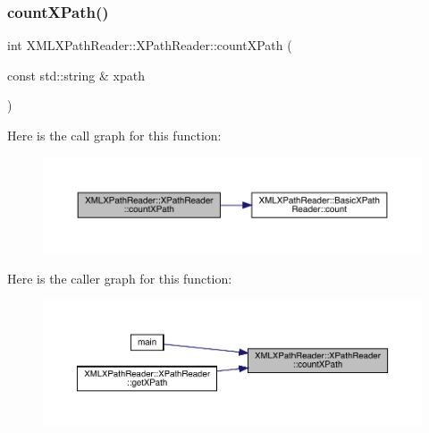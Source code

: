 \subsubsection{\texorpdfstring{countXPath()}{countXPath()}\hspace{0.1cm}{\footnotesize\ttfamily [1/3]}}
{\footnotesize\ttfamily int X\+M\+L\+X\+Path\+Reader\+::\+X\+Path\+Reader\+::count\+X\+Path (\begin{DoxyParamCaption}\item[{const std\+::string \&}]{xpath }\end{DoxyParamCaption})\hspace{0.3cm}{\ttfamily [inline]}}

Here is the call graph for this function\+:
\nopagebreak
\begin{figure}[H]
\begin{center}
\leavevmode
\includegraphics[width=350pt]{d3/d5a/classXMLXPathReader_1_1XPathReader_a9fd76703ea5321a4666ca9a0c07a222a_cgraph}
\end{center}
\end{figure}
Here is the caller graph for this function\+:
\nopagebreak
\begin{figure}[H]
\begin{center}
\leavevmode
\includegraphics[width=350pt]{d3/d5a/classXMLXPathReader_1_1XPathReader_a9fd76703ea5321a4666ca9a0c07a222a_icgraph}
\end{center}
\end{figure}
\mbox{\label{classXMLXPathReader_1_1XPathReader_a9fd76703ea5321a4666ca9a0c07a222a}} 
